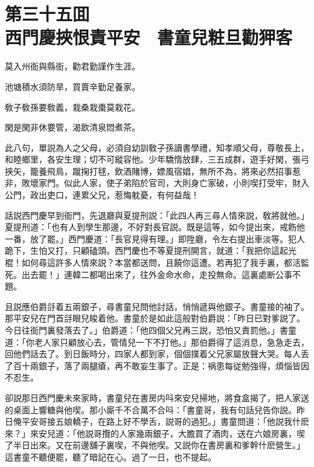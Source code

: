 
\chapter*{第三十五囬　\\西門慶挾恨責平安　書童兒粧旦勸狎客}


\begin{myquote}
莫入州衙與縣衙，勸君勤謹作生涯。

池塘積水須防旱，買賣辛勤足養家。

敎子敎孫要敎義，栽桑栽棗莫栽花。

閑是閑非休要管，渴飲清泉悶煮茶。
\end{myquote}

此八句，單説為人之父母，必須自幼訓敎子孫讀書學禮，知孝順父母，尊敬長上，和睦鄉里，各安生理；切不可縱容他。少年驕惰放肆，三五成群，遊手好閑，張弓挾矢，籠養飛鳥，蹴掬打毬，飲酒賭博，嫖風宿娼，無所不為，將來必然招事惹非，敗壞家門。似此人家，使子弟陷於官司，大則身亡家破，小則喫打受牢，財入公門，政出吏口，連累父兄，惹悔躭憂，有何益哉！

話説西門慶早到衙門，先退廳與夏提刑説：「此四人再三尋人情來説，敎將就他。」夏提刑道：「也有人到學生那邊，不好對長官説。既是這等，如今提出來，戒飭他一番，放了罷。」西門慶道：「長官見得有理。」即陞廳，令左右提出車淡等。犯人跪下，生怕又打，只顧磕頭。西門慶也不等夏提刑開言，就道：「我把你這起光棍！如何尋這許多人情來説？本當都送問，且饒你這遭。若再犯了我手裏，都活監死。出去罷！」連韓二都喝出來了，往外金命水命，走投無命。這裏處断公事不題。

且説應伯爵㧱着五兩銀子，尋書童兒問他討話，悄悄遞與他銀子。書童接的袖了。那平安兒在門首㧱眼兒睃着他。書童於是如此這般對伯爵説：「昨日已對爹説了。今日往衙門裏發落去了。」伯爵道：「他四個父兄再三説，恐怕又責罰他。」書童道：「你老人家只顧放心去，管情兒一下不打他。」那伯爵得了這消息，急急走去，回他們話去了。到日飯時分，四家人都到家，個個撲着父兄家屬放聲大哭。每人丢了百十兩銀子，落了兩腿瘡，再不敢妄生事了。正是：祸患每従勉強得，煩惱皆因不忍生。

卻説那日西門慶未來家時，書童兒在書房内呌來安兒掃地，將食盒揭了，把人家送的桌面上響糖與他喫。那小廝千不合萬不合呌：「書童哥，我有句話兒告你説。昨日俺平安哥接五娘轎子，在路上好不學舌，説哥的過犯。」書童問道：「他説我什麽來？」來安兒道：「他説哥攬的人家幾兩銀子，大膽買了酒肉，送在六娘房裏，喫了半日出來。又在前邊舖子裏喫，不與他喫。又説你在書房裏和爹幹什麽營生。」這書童不聽便罷，聽了暗記在心。過了一日，也不提起。


